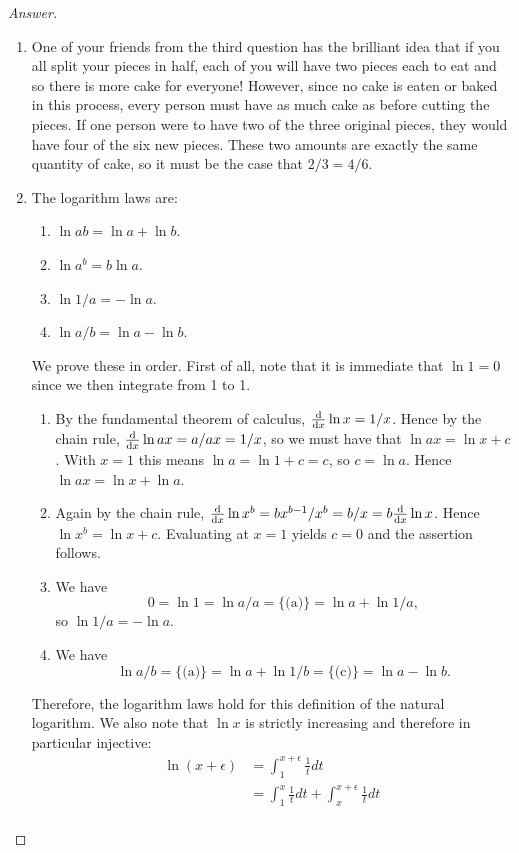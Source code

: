 \begin{proof}[Answer]
\begin{enumerate}[wide]
\item One of your friends from the third question has the brilliant idea that if you all split your pieces in half, each of you will have two pieces each to eat and so there is more cake for everyone! However, since no cake is eaten or baked in this process, every person must have as much cake as before cutting the pieces. If one person were to have two of the three original pieces, they would have four of the six new pieces. These two amounts are exactly the same quantity of cake, so it must be the case that $2/3 = 4/6$.

\item

The logarithm laws are:
\begin{enumerate}
  \item $\ln{ab} = \ln{a} + \ln{b}$.
  \item $\ln{a^b} = b\ln{a}$.
  \item $\ln{1/a} = -\ln{a}$.
  \item $\ln{a/b} = \ln{a} - \ln{b}$.
\end{enumerate}
We prove these in order. First of all, note that it is immediate that $\ln{1} = 0$ since we then integrate from 1 to 1.
\begin{enumerate}
  \item By the fundamental theorem of calculus, $\frac{\text{d}}{\text{d}x} \ln{x} = 1/x$. Hence by the chain rule, $\frac{\text{d}}{\text{d}x} \ln{ax} = a/ax = 1/x$, so we must have that $\ln{ax} = \ln{x} + c$. With $x=1$ this means $\ln{a} = \ln{1} + c = c$, so $c = \ln{a}$. Hence $\ln{ax} = \ln{x} + \ln{a}$.
  \item Again by the chain rule, $\frac{\text{d}}{\text{d}x} \ln{x^b} = bx^{b-1}/x^b = b/x= b\frac{\text{d}}{\text{d}x} \ln{x}$. Hence $\ln{x^b} = \ln{x} + c$. Evaluating at $x=1$ yields $c = 0$ and the assertion follows.
  \item We have
  \[
    0 = \ln{1} = \ln{a/a} = \{\text{(a)}\} = \ln{a} + \ln{1/a},
  \]
  so $\ln{1/a} = - \ln{a}$.
  \item We have
  \[
    \ln{a/b} = \{\text{(a)}\}  = \ln{a} + \ln{1/b} = \{\text{(c)}\} = \ln{a} - \ln{b}.
  \]
  \end{enumerate}
  Therefore, the logarithm laws hold for this definition of the natural logarithm. We also note that $\ln{x}$ is strictly increasing and therefore in particular injective:
  \[
  \begin{aligned}
  \ln(x+\epsilon) &= \int_{1}^{x+\epsilon}\frac{1}{t}dt \\
&= \int_{1}^{x}\frac{1}{t}dt + \int_{x}^{x+\epsilon}\frac{1}{t}dt \\

\end{aligned}\]
\end{enumerate}
\end{proof}
